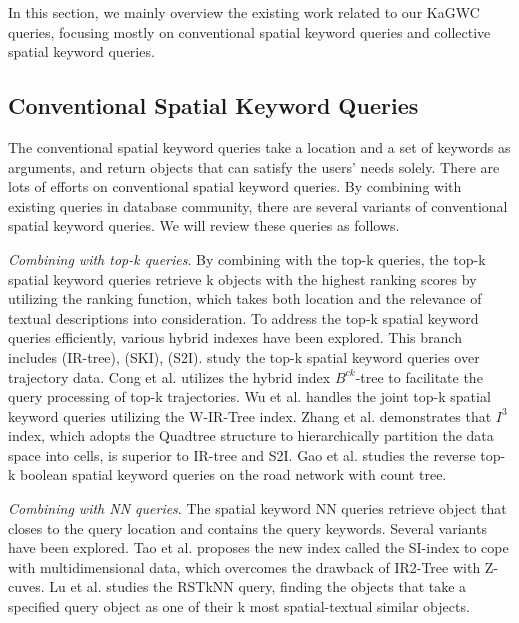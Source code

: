 In this section, we mainly overview the existing work related to our KaGWC queries, focusing mostly on conventional spatial keyword queries and collective spatial keyword queries.

\subsection{Conventional Spatial Keyword Queries}
The conventional spatial keyword queries \cite{cong2009efficient, de2008keyword} take a location and a set of keywords as arguments, and return objects that can satisfy the users' needs solely. There are lots of efforts on conventional spatial keyword queries. By combining with existing queries in database community, there are several variants of conventional spatial keyword queries. We will review these queries as follows.

\textit{Combining with top-k queries}. By combining with the top-k queries, the top-k spatial keyword queries \cite{cong2009efficient, gaoefficient, li2011ir, rocha2012top, shang2012user, wu2012joint, wu2011efficient} retrieve k objects with the highest ranking scores by utilizing the ranking function, which takes both location and the relevance of textual descriptions into consideration. To address the top-k spatial keyword queries efficiently, various hybrid indexes have been explored. This branch includes \cite{cong2009efficient, li2011ir} (IR-tree), \cite{cary2010efficient} (SKI), \cite{rocha2011efficient, rocha2012top} (S2I). \cite{cong2012efficient, shang2012user} study the top-k spatial keyword queries over trajectory data. Cong et al. \cite{cong2012efficient} utilizes the hybrid index $B^{ck}$-tree to facilitate the query processing of top-k trajectories. Wu et al. \cite{wu2012joint} handles the joint top-k spatial keyword queries utilizing the W-IR-Tree index. Zhang et al. \cite{zhang2013scalable} demonstrates that $I^3$ index, which adopts the Quadtree structure to hierarchically partition the data space into cells, is superior to IR-tree and S2I. Gao et al. \cite{gaoefficient} studies the reverse top-k boolean spatial keyword queries on the road network with count tree.

\textit{Combining with NN queries}. The spatial keyword NN queries retrieve object that closes to the query location and contains the query keywords. Several variants have been explored. Tao et al. \cite{tao2014fast} proposes the new index called the SI-index to cope with multidimensional data, which overcomes the drawback of IR2-Tree \cite{de2008keyword} with Z-cuves. Lu et al. \cite{lu2011reverse} studies the RSTkNN query, finding the objects that take a specified query object as one of their k most spatial-textual similar objects.

